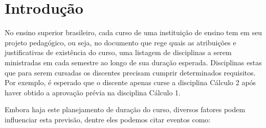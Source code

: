 \chapter{Introdução} %




No ensino superior brasileiro, cada curso de uma instituição de ensino tem em seu projeto pedagógico, ou seja, no documento que rege quais as atribuições e justificativas de existência do curso, uma listagem de disciplinas a serem ministradas em cada semestre ao longo de sua duração esperada. Disciplinas estas que para serem cursadas os discentes precisam cumprir determinados requisitos. Por exemplo, é esperado que o discente apenas curse a disciplina Cálculo 2 após haver obtido a aprovação prévia na disciplina Cálculo 1.


Embora haja este planejamento de duração do curso, diversos fatores podem influenciar esta previsão, dentre eles podemos citar eventos como:

